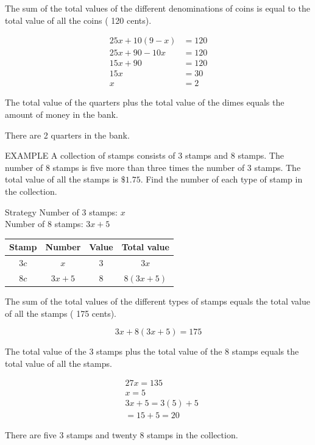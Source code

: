 \documentclass{ximera}
\begin{document}
\begin{problem}
\begin{solution}
The sum of the total values of the different denominations of coins is equal to the total value of all the coins ( 120 cents).

$$\begin{aligned}
25 x+10(9-x) & =120 \\
25 x+90-10 x & =120 \\
15 x+90 & =120 \\
15 x & =30 \\
x & =2
\end{aligned}$$

The total value of the quarters plus the total value of the dimes equals the amount of money in the bank.

There are 2 quarters in the bank.
\end{solution}
\end{problem}

\begin{problem}
EXAMPLE A collection of stamps consists of 3\textcent{} stamps and 8\textcent{} stamps. The number of 8\textcent{} stamps is five more than three times the number of 3\textcent{} stamps. The total value of all the stamps is $\$ 1.75$. Find the number of each type of stamp in the collection.

Strategy Number of 3\textcent{} stamps: $x$\\

Number of 8\textcent{} stamps: $3 x+5$

\begin{center}
\begin{tabular}{c|c|c|c}
Stamp & Number & Value & Total value \\
\hline
$3 c$ & $x$ & 3 & $3 x$ \\
\hline
$8 c$ & $3 x+5$ & 8 & $8(3 x+5)$ \\
\hline
\end{tabular}
\end{center}

The sum of the total values of the different types of stamps equals the total value of all the stamps ( 175 cents).

\begin{solution}
$$3 x+8(3 x+5)=175$$

The total value of the 3\textcent{} stamps plus the total value of the 8 stamps equals the total value of all the stamps.

$$\begin{aligned}
& 27 x=135 \\
& x=5 \\
& 3 x+5=3(5)+5 \\
&=15+5=20
\end{aligned}$$

There are five 3\textcent{} stamps and twenty 8\textcent{} stamps in the collection.
\end{solution}
\end{problem}
\end{document}
